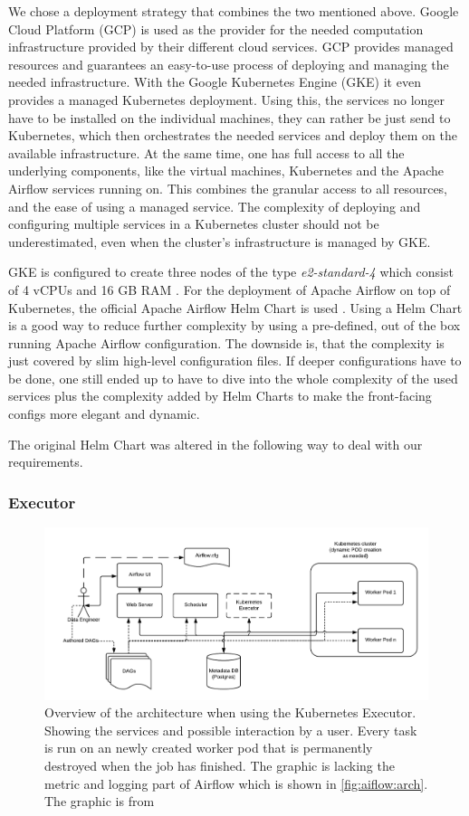 \documentclass[a4paper,journal]{IEEEtran}
\begin{document}
We chose a deployment strategy that combines the two mentioned above. Google Cloud Platform (GCP) is used as the provider for the needed computation infrastructure provided by their different cloud services. GCP provides managed resources and guarantees an easy-to-use process of deploying and managing the needed infrastructure. With the Google Kubernetes Engine (GKE) it even provides a managed Kubernetes deployment. Using this, the services no longer have to be installed on the individual machines, they can rather be just send to Kubernetes, which then orchestrates the needed services and deploy them on the available infrastructure. At the same time, one has full access to all the underlying components, like the virtual machines, Kubernetes and the Apache Airflow services running on. This combines the granular access to all resources, and the ease of using a managed service. The complexity of deploying and configuring multiple services in a Kubernetes cluster should not be underestimated, even when the cluster's infrastructure is managed by GKE.

GKE is configured to create three nodes of the type \textit{e2-standard-4} which consist of 4 vCPUs and 16 GB RAM \cite{gcpMachineType}.
For the deployment of Apache Airflow on top of Kubernetes, the official Apache Airflow Helm Chart is used \cite{airflowHelmChart}. Using a Helm Chart is a good way to reduce further complexity by using a pre-defined, out of the box running Apache Airflow configuration. The downside is, that the complexity is just covered by slim high-level configuration files. If deeper configurations have to be done, one still ended up to have to dive into the whole complexity of the used services plus the complexity added by Helm Charts to make the front-facing configs more elegant and dynamic.

The original Helm Chart \cite{airflowHelmChart} was altered in the following way to deal with our requirements.
\subsubsection{Executor}

\begin{figure}[b]
    \centering
	\includegraphics[width=0.8\linewidth]{images/arch-diag-kubernetes.png}
	\caption{Overview of the architecture when using the Kubernetes Executor. Showing the services and possible interaction by a user. Every task is run on an newly created worker pod that is permanently destroyed when the job has finished. The graphic is lacking the metric and logging part of Airflow which is shown in \autoref{fig:aiflow:arch}. The graphic is from \cite{airflowExecutorKubernetes}}
	\label{fig:airflow_arch_kubernetes}
\end{figure}
\end{document}
